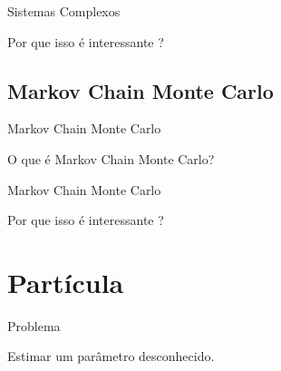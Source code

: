 \documentclass{beamer}
\begin{document}
\begin{frame}{Sistemas Complexos}

Por que isso é interessante ?

\end{frame}



\subsection{Markov Chain Monte Carlo}

\begin{frame}{Markov Chain Monte Carlo}

O que é Markov Chain Monte Carlo?

\end{frame}


\begin{frame}{Markov Chain Monte Carlo}

Por que isso é interessante ?

\end{frame}





\section{Partícula}
\begin{frame}{Problema}
\noindent

 \begin{block}{}
  {\large Estimar um parâmetro desconhecido.}
\end{block}



\end{frame}
\end{document}

